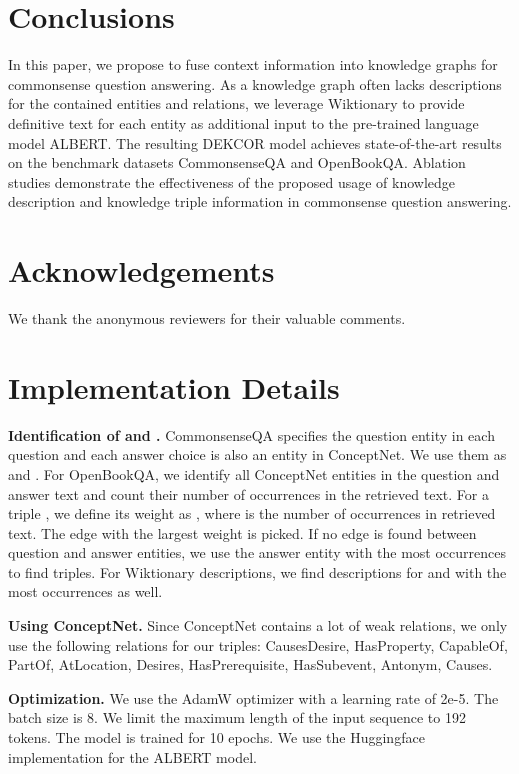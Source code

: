 \documentclass[11pt,a4paper]{article}
\begin{document}
\section{Conclusions}
\label{sec:conclusion}
In this paper, we propose to fuse context information into knowledge graphs for commonsense question answering. As a knowledge graph often lacks descriptions for the contained entities and relations, we leverage Wiktionary to provide definitive text for each entity as additional input to the pre-trained language model ALBERT. The resulting DEKCOR model achieves state-of-the-art results on the benchmark datasets CommonsenseQA and OpenBookQA. Ablation studies demonstrate the effectiveness of the proposed usage of knowledge description and knowledge triple information in commonsense question answering.

\section*{Acknowledgements}
We thank the anonymous reviewers for their valuable comments.




\clearpage
\appendix
\section{Implementation Details}

\noindent \textbf{Identification of  and .} CommonsenseQA specifies the question entity in each question and each answer choice is also an entity in ConceptNet. We use them as  and . For OpenBookQA, we identify all ConceptNet entities in the question and answer text and count their number of occurrences in the retrieved text. For a triple , we define its weight as , where  is the number of occurrences in retrieved text. The edge with the largest weight is picked. If no edge is found between question and answer entities, we use the answer entity with the most occurrences to find triples. For Wiktionary descriptions, we find descriptions for  and  with the most occurrences as well.

\noindent \textbf{Using ConceptNet.} Since ConceptNet contains a lot of weak relations, we only use the following relations for our triples: CausesDesire, HasProperty, CapableOf, PartOf, AtLocation, Desires, HasPrerequisite, HasSubevent, Antonym, Causes.

\noindent\textbf{Optimization.}
We use the AdamW \citep{adamw} optimizer with a learning rate of 2e-5. The batch size is 8. We limit the maximum length of the input sequence to 192 tokens. The model is trained for 10 epochs. We use the Huggingface \citep{huggingface} implementation for the ALBERT model.
\end{document}
